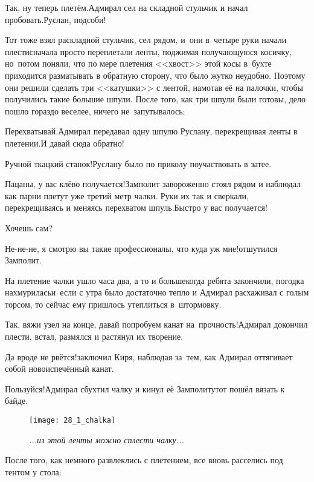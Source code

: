 \diagdash Так, ну теперь плетём.\mdash Адмирал сел на складной стульчик и начал пробовать.\mdash Руслан, подсоби!

Тот тоже взял раскладной стульчик, сел рядом, и~они в~четыре руки начали плести\mdash сначала просто переплетали ленты, поджимая получающуюся косичку, но~потом поняли, что по мере плетения <<хвост>> этой косы в~бухте приходится разматывать в обратную сторону, что было жутко неудобно. Поэтому они решили сделать три <<катушки>> с лентой, намотав её на палочки, чтобы получились такие большие шпули. После того, как три шпули были готовы, дело пошло гораздо веселее, ничего не~запутывалось:

\diagdash Перехватывай.\mdash Адмирал передавал одну шпулю Руслану, перекрещивая ленты в плетении.\mdash И давай сюда обратно!

\diagdash Ручной ткацкий станок!\mdash Руслану было по приколу поучаствовать в затее.

\diagdash Пацаны, у вас клёво получается!\mdash Замполит завороженно стоял рядом и наблюдал как парни плетут уже третий метр чалки. Руки их так и сверкали, перекрещиваясь и меняясь перехватом шпуль.\mdash Быстро у вас получается!

\diagdash Хочешь сам?

\diagdash Не-не-не, я смотрю вы такие профессионалы, что куда уж мне!\mdash отшутился Замполит.

На плетение чалки ушло часа два, а то и больше\mdash когда ребята закончили, погодка нахмурилась\mdash и~если с утра было достаточно тепло и Адмирал расхаживал с голым торсом, то сейчас ему пришлось утеплиться в~штормовку.

\diagdash Так, вяжи узел на конце, давай попробуем канат на~прочность!\mdash Адмирал докончил плести, встал, размялся и растянул их творение.

\diagdash Да вроде не рвётся!\mdash заключил Киря, наблюдая за~тем, как Адмирал оттягивает собой новоиспечённый канат.

\diagdash Пользуйся!\mdash Адмирал сбухтил чалку и кинул её Замполиту\mdash тот пошёл вязать к байде.

\begin{figure}[h]
	\centering
	\texttt{[image: 28\_1\_chalka]}
	\caption{\small\textit{...из этой ленты можно сплести чалку...}}
\end{figure}
После того, как немного развлеклись с плетением, все вновь расселись под тентом у стола:

